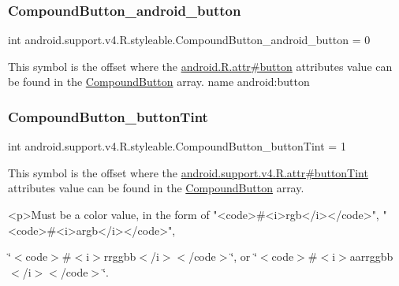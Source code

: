 \subsubsection{\texorpdfstring{Compound\+Button\+\_\+android\+\_\+button}{CompoundButton\_android\_button}}
{\footnotesize\ttfamily int android.\+support.\+v4.\+R.\+styleable.\+Compound\+Button\+\_\+android\+\_\+button = 0\hspace{0.3cm}{\ttfamily [static]}}

This symbol is the offset where the \hyperlink{}{android.\+R.\+attr\#button} attribute\textquotesingle{}s value can be found in the \hyperlink{classandroid_1_1support_1_1v4_1_1R_1_1styleable_ab9cf77e48999c324e11a9b63f5429cfd}{Compound\+Button} array.  name android\+:button \mbox{\label{classandroid_1_1support_1_1v4_1_1R_1_1styleable_aa3973f711ba64818b88ee75a71f6c911}} 
\subsubsection{\texorpdfstring{Compound\+Button\+\_\+button\+Tint}{CompoundButton\_buttonTint}}
{\footnotesize\ttfamily int android.\+support.\+v4.\+R.\+styleable.\+Compound\+Button\+\_\+button\+Tint = 1\hspace{0.3cm}{\ttfamily [static]}}

This symbol is the offset where the \hyperlink{classandroid_1_1support_1_1v4_1_1R_1_1attr_a68ad5bf40f3267e918dbf536fd164b52}{android.\+support.\+v4.\+R.\+attr\#button\+Tint} attribute\textquotesingle{}s value can be found in the \hyperlink{classandroid_1_1support_1_1v4_1_1R_1_1styleable_ab9cf77e48999c324e11a9b63f5429cfd}{Compound\+Button} array.

\begin{DoxyVerb}      <p>Must be a color value, in the form of "<code>#<i>rgb</i></code>", "<code>#<i>argb</i></code>",
\end{DoxyVerb}
 \char`\"{}$<$code$>$\#$<$i$>$rrggbb$<$/i$>$$<$/code$>$\char`\"{}, or \char`\"{}$<$code$>$\#$<$i$>$aarrggbb$<$/i$>$$<$/code$>$\char`\"{}. 

